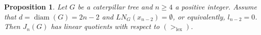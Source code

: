 \documentclass{amsart}
\newtheorem{proposition}[theorem]{Proposition}
\theoremstyle{remark}
\theoremstyle{definition}
\DeclareMathOperator{\lex}{lex}
\DeclareMathOperator{\diam}{diam}
\begin{document}
	
	\begin{proposition}\label{prop:LQ-2n-2-alternative}
		Let $G$ be a caterpillar tree and $n\geq 4$ a positive integer. Assume that $d=\diam(G)=2n-2$ and $LN_G(x_{n-2})=\emptyset$, or equivalently, $l_{n-2}=0$. Then $J_n(G)$ has linear quotients with respect to $(>_{\lex})$.
	\end{proposition}
\end{document}

